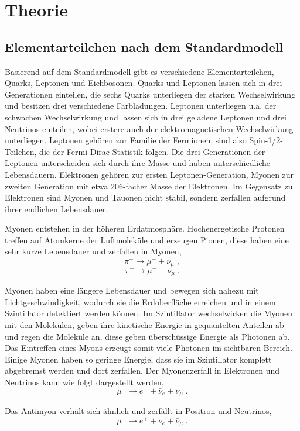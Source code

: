 \section{Theorie}

\subsection{Elementarteilchen nach dem Standardmodell}

Basierend auf dem Standardmodell gibt es verschiedene Elementarteilchen, Quarks, Leptonen und Eichbosonen. Quarks und Leptonen lassen sich in drei Generationen einteilen, die sechs Quarks unterliegen der starken Wechselwirkung und besitzen drei verschiedene Farbladungen. Leptonen unterliegen u.a. der schwachen Wechselwirkung und lassen sich in drei geladene Leptonen und drei Neutrinos einteilen, wobei erstere auch der elektromagnetischen Wechselwirkung unterliegen. Leptonen gehören zur Familie der Fermionen, sind also Spin-1/2-Teilchen, die der Fermi-Dirac-Statistik folgen. Die drei Generationen der Leptonen unterscheiden sich durch ihre Masse und haben unterschiedliche Lebensdauern. Elektronen gehören zur ersten Leptonen-Generation, Myonen zur zweiten Generation mit etwa 206-facher Masse der Elektronen. Im Gegensatz zu Elektronen sind Myonen und Tauonen nicht stabil, sondern zerfallen aufgrund ihrer endlichen Lebensdauer.

Myonen entstehen in der höheren Erdatmosphäre. Hochenergetische Protonen treffen auf Atomkerne der Luftmoleküle und erzeugen Pionen, diese haben eine sehr kurze Lebensdauer und zerfallen in Myonen, $$\pi^+ \rightarrow \mu^+ + \nu_\mu\; ,$$ $$\pi^- \rightarrow \mu^- + \bar{\nu}_\mu\; .$$

Myonen haben eine längere Lebensdauer und bewegen sich nahezu mit Lichtgeschwindigkeit, wodurch sie die Erdoberfläche erreichen und in einem Szintillator detektiert werden können. Im Szintillator wechselwirken die Myonen mit den Molekülen, geben ihre kinetische Energie in gequantelten Anteilen ab und regen die Moleküle an, diese geben überschüssige Energie als Photonen ab. Das Eintreffen eines Myons erzeugt somit viele Photonen im sichtbaren Bereich. Einige Myonen haben so geringe Energie, dass sie im Szintillator komplett abgebremst werden und dort zerfallen. Der Myonenzerfall in Elektronen und Neutrinos kann wie folgt dargestellt werden, $$\mu^- \rightarrow e^- + \bar{\nu}_e + \nu_\mu\; . $$

Das Antimyon verhält sich ähnlich und zerfällt in Positron und Neutrinos, $$\mu^+ \rightarrow e^+ + \nu_e + \bar{\nu}_\mu\; .$$

